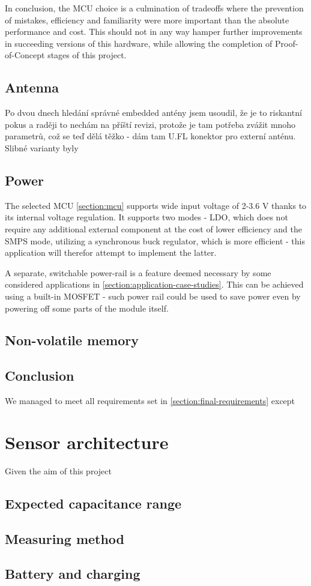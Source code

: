 In conclusion, the MCU choice is a culmination of tradeoffs where the prevention of mistakes, efficiency and familiarity were more important than the absolute performance and cost. This should not in any way hamper further improvements in succeeding versions of this hardware, while allowing the completion of Proof-of-Concept stages of this project. 

\subsection{Antenna}
Po dvou dnech hledání správné embedded antény jsem usoudil, že je to riskantní pokus a raději to nechám na příští revizi, protože je tam potřeba zvážit mnoho parametrů, což se teď dělá těžko - dám tam U.FL konektor pro externí anténu. Slibné varianty byly

\subsection{Power}
The selected MCU \ref{section:mcu} supports wide input voltage of 2-3.6 V thanks to its internal voltage regulation. It supports two modes - LDO, which does not require any additional external component at the cost of lower efficiency and the SMPS mode, utilizing a synchronous buck regulator, which is more efficient - this application will therefor attempt to implement the latter.

A separate, switchable power-rail is a feature deemed necessary by some considered applications in \ref{section:application-case-studies}. This can be achieved using a built-in MOSFET - such power rail could be used to save power even by powering off some parts of the module itself.

\subsection{Non-volatile memory}

\subsection{Conclusion}
We managed to meet all requirements set in \ref{section:final-requirements} except


\section{Sensor architecture}

Given the aim of this project

\subsection{Expected capacitance range}

\subsection{Measuring method}

\subsection{Battery and charging}
